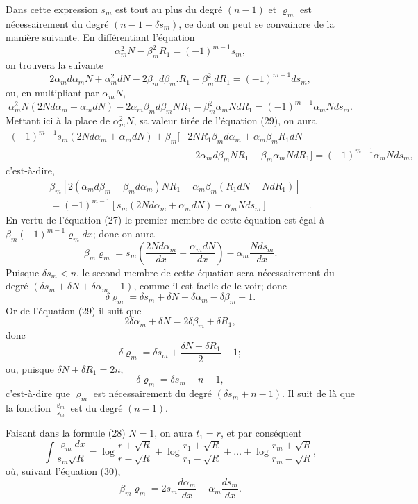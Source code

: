 \documentclass[oneside, 12 pt, leqno]{memoir}
\begin{document}
Dans cette expression \(s_m\) est tout au plus du degré \((n-1)\) et \(\varrho_m\) est nécessairement du degré \(\left(n-1+\delta s_m\right)\), ce dont on peut se convaincre de la manière suivante. En différentiant l'équation
\[\tag{29}\alpha_m^2 N-\beta_m^2 R_1=(-1)^{m-1} s_m,\]
on trouvera la suivante
\[2 \alpha_m d \alpha_m N+\alpha_m^2 d N-2 \beta_m d \beta_m. R_1-\beta_m^2 d R_1=(-1)^{m-1} d s_m,\]
ou, en multipliant par \(\alpha_m N\),
\[\alpha_m^2 N\left(2 N d \alpha_m+\alpha_m d N\right)-2 \alpha_m \beta_m d \beta_m N R_1-\beta_m^2 \alpha_m N d R_1=(-1)^{m-1} \alpha_m N d s_m.\]
Mettant ici à la place de \(\alpha_m^2 N\), sa valeur tirée de l'équation (29), on aura
\[\begin{aligned}
(-1)^{m-1} s_m\left(2 N d \alpha_m+\alpha_m d N\right) +\beta_m [&2 N R_1 \beta_m d \alpha_m+\alpha_m \beta_m R_1 d N \\
&-2 \alpha_m d \beta_m N R_1 -\beta_m \alpha_m N d R_1]
=(-1)^{m-1} \alpha_m N d s_m,
\end{aligned}\]
c'est-à-dire,
\[\begin{aligned}
\beta_m\left[2\left(\alpha_m d \beta_m-\beta_m d \alpha_m\right) N R_1-\alpha_m \beta_m\left(R_1 d N-N d R_1\right)\right] &\\
=(-1)^{m-1}\left[s_m\left(2 N d \alpha_m+\alpha_m d N\right)-\alpha_m N d s_m\right]&.
\end{aligned}\]
En vertu de l'équation (27) le premier membre de cette équation est égal à \(\beta_m(-1)^{m-1} \varrho_m d x\); donc on aura
\[\tag{30}\beta_m \varrho_m=s_m\left(\frac{2 N d \alpha_m}{d x}+\frac{\alpha_m d N}{d x}\right)-\alpha_m \frac{N d s_m}{d x}.\]
Puisque \(\delta s_m<n\), le second membre de cette équation sera nécessairement du degré \(\left(\delta s_m+\delta N+\delta \alpha_m-1\right)\), comme il est facile de le voir; donc
\[\delta \varrho_m=\delta s_m+\delta N+\delta \alpha_m-\delta \beta_m-1.\]
Or de l'équation (29) il suit que
\[2 \delta \alpha_m+\delta N=2 \delta \beta_m+\delta R_1,\]
donc
\[\delta \varrho_m=\delta s_m+\frac{\delta N+\delta R_1}{2}-1;\]
ou, puisque \(\delta N+\delta R_1=2 n\),
\[\delta \varrho_m=\delta s_m+n-1,\]
c'est-à-dire que \(\varrho_m\) est nécessairement du degré \(\left(\delta s_m+n-1\right)\). Il suit de là que la fonction \(\frac{\varrho_m}{s_m}\) est du degré \((n-1)\).

Faisant dans la formule (28) \(N=1\), on aura \(t_1=r\), et par conséquent
\[\tag{31}\int \frac{\varrho_m d x}{s_m \sqrt{R}}=\log \frac{r+\sqrt{R}}{r-\sqrt{R}}+\log \frac{r_1+\sqrt{R}}{r_1-\sqrt{R}}+\dots+\log \frac{r_m+\sqrt{R}}{r_m-\sqrt{R}},\]
où, suivant l'équation (30),
\[\beta_m \varrho_m=2 s_m \frac{d \alpha_m}{d x}-\alpha_m \frac{d s_m}{d x}.\]
\end{document}
